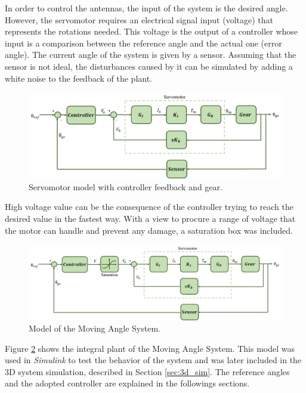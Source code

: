 In order to control the antennas, the input of the system is the desired angle. However, the servomotor requires an electrical signal input (voltage) that represents the rotations needed. This voltage is the output of a controller whose input is a comparison between the reference angle and the actual one (error angle). The current angle of the system is given by a sensor.
Assuming that the sensor is not ideal, the disturbances caused by it can be simulated by adding a white noise to the feedback of the plant.

\begin{figure}[H]
\centerline{
\includegraphics[scale=0.45]{figures/servo+gear+noise.png}}
\caption{Servomotor model with controller feedback and gear.}
\label{model4}
\end{figure}

High voltage value can be the consequence of the controller trying to reach the desired value in the fastest way. With a view to procure a range of voltage that the motor can handle and prevent any damage, a saturation box was included.

\begin{figure}[H]
\centerline{
\includegraphics[scale=0.4]{figures/complete_model.png}}
\caption{Model of the Moving Angle System.}
\label{model4}
\end{figure}

Figure \ref{model4} shows the integral plant of the Moving Angle System. This model was used in \emph{Simulink} to test the behavior of the system and was later included in the 3D system simulation, described in Section \ref{sec:3d_sim}. The reference angles and the adopted controller are explained in the followings sections.